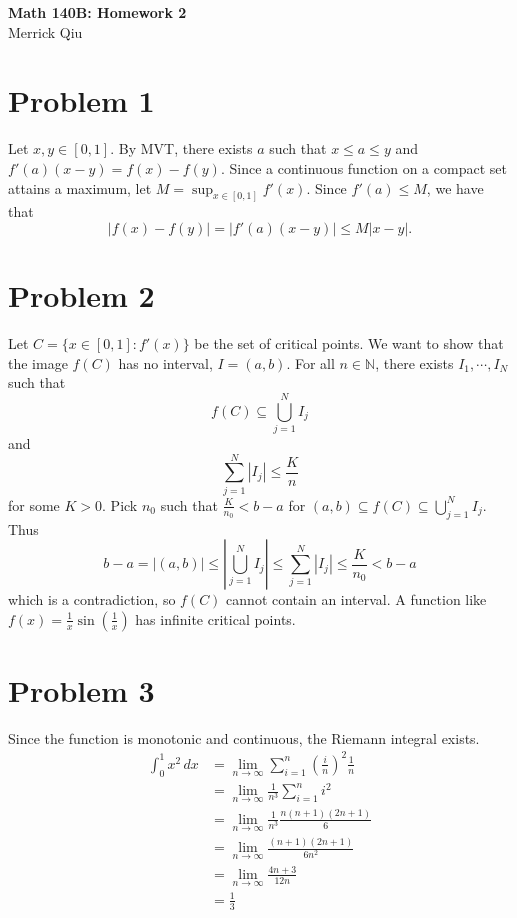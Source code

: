 \documentclass{article}
\begin{document}
\begin{center}
	\huge{\bf Math 140B: Homework 2} \\
	Merrick Qiu
\end{center}

\section*{Problem 1}
Let $x, y \in [0,1]$.
By MVT, there exists $a$ such that $x \leq a \leq y$ and
$f'(a)(x-y) = f(x)-f(y)$.
Since a continuous function on a compact set attains a maximum,
let $M = \sup_{{x\in[0,1]}} f'(x)$.
Since $f'(a) \leq M$, we have that 
\[
	|f(x)-f(y)| = |f'(a)(x-y)| \leq M|x-y|.
\]
\newpage 

\section*{Problem 2}

Let $C = \{x \in [0,1] : f'(x)\}$ be the set of critical points.
We want to show that the image $f(C)$ has no interval, $I = (a,b)$.
For all $n \in \mathbb{N}$, there exists $I_1, \cdots, I_N$ such that
\[
	f(C) \subseteq \bigcup_{j=1}^N I_j
\]
and 
\[
	\sum_{j=1}^N |I_j| \leq \frac{K}{n}
\]
for some $K > 0$.
Pick $n_0$ such that $\frac{K}{n_0} < b-a$ for $(a,b) \subseteq f(C) \subseteq \bigcup_{j=1}^N I_j$.
Thus 
\[
	 b-a = |(a,b)| \leq \left|\bigcup_{j=1}^N I_j\right| \leq \sum_{j=1}^N |I_j| \leq \frac{K}{n_0} < b-a
\]
which is a contradiction, so $f(C)$ cannot contain an interval.
A function like $f(x) = \frac{1}{x} \sin(\frac{1}{x})$ has infinite critical points.


\newpage 
\section*{Problem 3}
Since the function is monotonic and continuous, the Riemann integral exists.
\begin{align*}
	\int_0^1 x^2 \,dx &= \lim_{n \to \infty}  \sum_{i=1}^{n} \left(\frac{i}{n}\right)^2 \frac{1}{n}\\
	&= \lim_{n \to \infty}  \frac{1}{n^3} \sum_{i=1}^{n} i^2\\
	&= \lim_{n \to \infty}  \frac{1}{n^3} \frac{n(n+1)(2n+1)}{6}\\
	&= \lim_{n \to \infty}   \frac{(n+1)(2n+1)}{6n^2}\\
	&= \lim_{n \to \infty}   \frac{4n+3}{12n}\\
	&= \frac{1}{3}\\
\end{align*}
\newpage 
\end{document}
